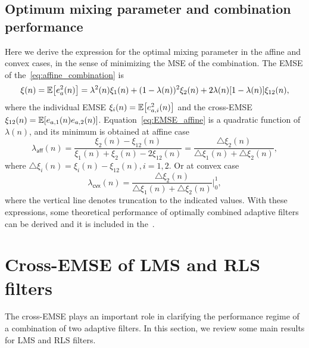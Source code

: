 \documentclass{article}
\begin{document}
\subsection{Optimum mixing parameter and combination performance}
Here we derive the expression for the optimal mixing parameter in the affine and convex cases, in the sense of minimizing the MSE of the combination.
The EMSE of the~\cref{eq:affine_combination} is
\begin{equation}\label{eq:EMSE_affine}
    \xi(n)= \E{e_a^2(n)} =
    \lambda^2(n)\xi_1(n)+(1-\lambda(n))^2\xi_2(n)+2\lambda(n)[1-\lambda(n)]\xi_{12}(n),
\end{equation}
where the individual EMSE $\xi_i(n)=\E{e_{a,i}^2(n)}$ and the cross-EMSE $\xi_{12}(n)=\E{e_{a,1}(n)e_{a,2}(n)}$.
Equation~\eqref{eq:EMSE_affine} is a quadratic function of $\lambda(n)$, and its minimum is obtained at affine case
\begin{equation}
    \lambda_{\mathsf{aff}}(n)=\frac{\xi_2(n)-\xi_{12}(n)}{\xi_1(n)+\xi_2(n)-2\xi_{12}(n)} = \frac{\triangle\xi_2(n)}{\triangle\xi_1(n)+\triangle\xi_{2}(n)},
\end{equation}
where $\triangle\xi_i(n)=\xi_i(n)-\xi_{12}(n), i=1,2$.
Or at convex case
\begin{equation}
    \lambda_{\mathsf{cvx}}(n)=\frac{\triangle\xi_2(n)}{\triangle\xi_1(n)+\triangle\xi_{2}(n)}\bigg\rvert_0^1,
\end{equation}
where the vertical line denotes truncation to the indicated values.
With these expressions, some theoretical performance of optimally combined adaptive filters can be derived and it is included in the~\cite{Arenas_Garcia_2016}.

\section{Cross-EMSE of LMS and RLS filters}
The cross-EMSE plays an important role in clarifying the performance regime of a combination of two adaptive filters. In this section, we review some main results for LMS and RLS filters.
\end{document}

